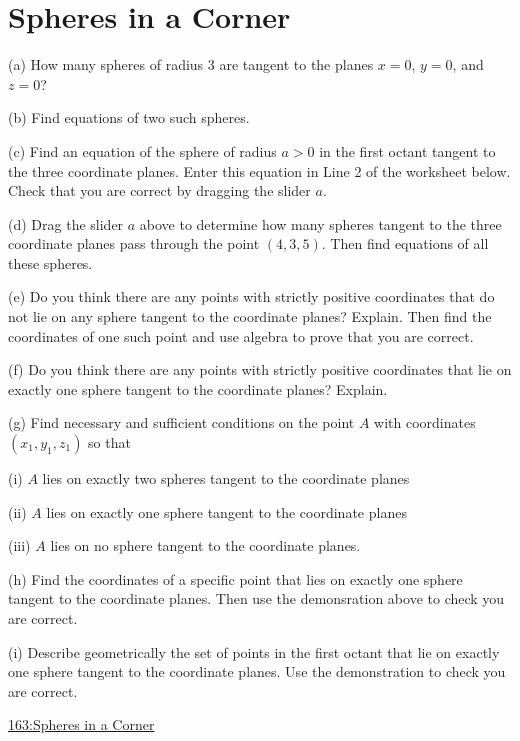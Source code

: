 \documentclass{ximera}
\begin{document}
\section*{Spheres in a Corner}
\begin{question}  \label{Q3442g455t}
(a) How many spheres of radius $3$ are tangent to the planes $x=0$, $y=0$, and $z=0$?

(b) Find equations of two such spheres.

(c) Find an equation of the sphere of radius $a > 0$ in the first octant tangent to the three coordinate planes. Enter this equation in Line 2 of the worksheet below. Check that you are correct by dragging the slider $a$.

\begin{exploration}
\begin{onlineOnly}
    \begin{center}
\end{center}
\end{onlineOnly}

(d) Drag the slider $a$ above to determine how many spheres tangent to the three coordinate planes pass through the point $(4,3,5)$. Then find equations of all these spheres.

(e) Do you think there are any points with strictly positive coordinates that do not lie on any sphere tangent to the coordinate planes? Explain. Then find the coordinates of one such point and use algebra to prove that you are correct. 

(f) Do you think there are any points with strictly positive coordinates that lie on exactly one sphere tangent to the coordinate planes? Explain.

(g) Find necessary and sufficient conditions on the point $A$ with coordinates $(x_1, y_1, z_1)$ so that 

(i) $A$ lies on exactly two spheres tangent to the coordinate planes

(ii) $A$ lies on exactly one sphere tangent to the coordinate planes

(iii) $A$ lies on no sphere tangent to the coordinate planes.

(h) Find the coordinates of a specific point that lies on exactly one sphere tangent to the coordinate planes. Then use the demonsration above to check you are correct.

(i) Describe geometrically the set of points in the first octant that lie on exactly one sphere tangent to the coordinate planes. Use the demonstration to check you are correct.


\href{https://www.desmos.com/3d/ljizsai4mu}{163:Spheres in a Corner}

\end{exploration}

\end{question}
\end{document}
